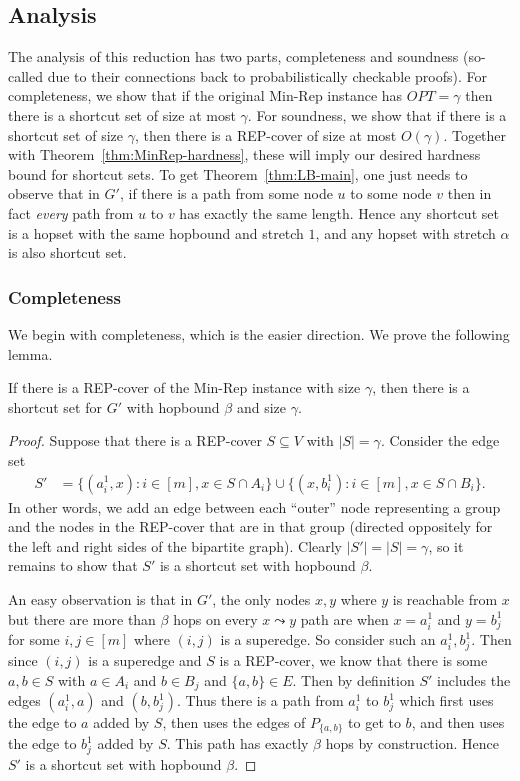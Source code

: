 \subsection{Analysis}
The analysis of this reduction has two parts, completeness and soundness (so-called due to their connections back to probabilistically checkable proofs).  For completeness, we show that if the original Min-Rep instance has $OPT = \gamma$ then there is a shortcut set of size at most $\gamma$.  For soundness, we show that if there is a shortcut set of size $\gamma$, then there is a REP-cover of size at most $O(\gamma)$.  Together with Theorem~\ref{thm:MinRep-hardness}, these will imply our desired hardness bound for shortcut sets.  To get Theorem~\ref{thm:LB-main}, one just needs to observe that in $G'$, if there is a path from some node $u$ to some node $v$ then in fact \emph{every} path from $u$ to $v$ has exactly the same length.  Hence any shortcut set is a hopset with the same hopbound and stretch $1$, and any hopset with stretch $\alpha$ is also shortcut set.

\subsubsection{Completeness}
We begin with completeness, which is the easier direction.  We prove the following lemma.

\begin{lemma} \label{lem:completeness}
    If there is a REP-cover of the Min-Rep instance with size $\gamma$, then there is a shortcut set for $G'$ with hopbound $\beta$ and size $\gamma$.
\end{lemma}
\begin{proof}
Suppose that there is a REP-cover $S \subseteq V$ with $|S|= \gamma$.  Consider the edge set 
\begin{align*}
    S' &= \{(a_i^1, x) : i \in [m], x \in S \cap A_i\} \cup \{(x, b_i^1) : i \in [m], x \in S \cap B_i\}.
\end{align*}
In other words, we add an edge between each ``outer'' node representing a group and the nodes in the REP-cover that are in that group (directed oppositely for the left and right sides of the bipartite graph).  Clearly $|S'| = |S| = \gamma$, so it remains to show that $S'$ is a shortcut set with hopbound $\beta$.  

An easy observation is that in $G'$, the only nodes $x, y$ where $y$ is reachable from $x$ but there are more than $\beta$ hops on every $x \leadsto y$ path are when $x = a_i^1$ and $y = b_j^1$ for some $i,j \in [m]$ where $(i,j)$ is a superedge.  So consider such an $a_i^1, b_j^1$.  Then since $(i,j)$ is a superedge and $S$ is a REP-cover, we know that there is some $a,b \in S$ with $a \in A_i$ and $b \in B_j$ and $\{a,b\} \in E$.  Then by definition $S'$ includes the edges $(a_i^1, a)$ and $(b, b_j^1)$.  Thus there is a path from $a_i^1$ to $b_j^1$ which first uses the edge to $a$ added by $S$, then uses the edges of $P_{\{a,b\}}$ to get to $b$, and then uses the edge to $b_j^1$ added by $S$.  This path has exactly $\beta$ hops by construction.  Hence $S'$ is a shortcut set with hopbound $\beta$.
\end{proof}

